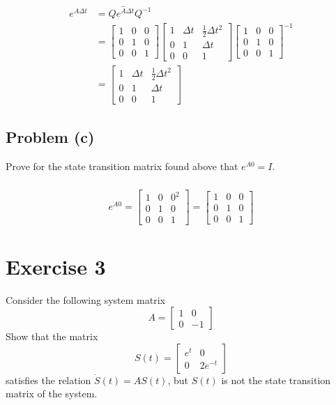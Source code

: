 \documentclass[11pt]{article}
\begin{document}
\begin{align*}
	e^{A\Delta t} &= Qe^{\hat{A}\Delta t}Q^{-1} \\
	&= \begin{bmatrix} 1 & 0 & 0 \\ 0 & 1 & 0 \\ 0 & 0 & 1 \end{bmatrix} \begin{bmatrix} 1 & \Delta t & \frac{1}{2} \Delta t^2 \\ 0 & 1 & \Delta t \\ 0 & 0 & 1 \end{bmatrix} \begin{bmatrix} 1 & 0 & 0 \\ 0 & 1 & 0 \\ 0 & 0 & 1 \end{bmatrix}^{-1} \\
	&= \begin{bmatrix} 1 & \Delta t & \frac{1}{2}\Delta t^2 \\
					   0 & 1 & \Delta t \\
					   0 & 0 & 1 \end{bmatrix}
\end{align*}

\subsection*{Problem (c)}
Prove for the state transition matrix found above that $e^{A0} = I$.

\subparagraph*{} 
\begin{equation*}
	e^{A0} = \begin{bmatrix} 1 & 0 & 0^2 \\
							 0 & 1 & 0 \\
							 0 & 0 & 1 \end{bmatrix}
			= \begin{bmatrix} 1 & 0 & 0 \\
							  0 & 1 & 0 \\
							  0 & 0 & 1 \end{bmatrix}
\end{equation*}

\section*{Exercise 3}
Consider the following system matrix
\begin{equation*}
	A = \begin{bmatrix} 1 & 0 \\ 0 & -1 \end{bmatrix}
\end{equation*}
Show that the matrix
\begin{equation*}
	S(t) = \begin{bmatrix} e^t & 0 \\ 0 & 2e^{-t} \end{bmatrix}
\end{equation*}
satisfies the relation $\dot{S}(t) = AS(t)$, but $S(t)$ is not the state transition matrix of the system.
\end{document}
